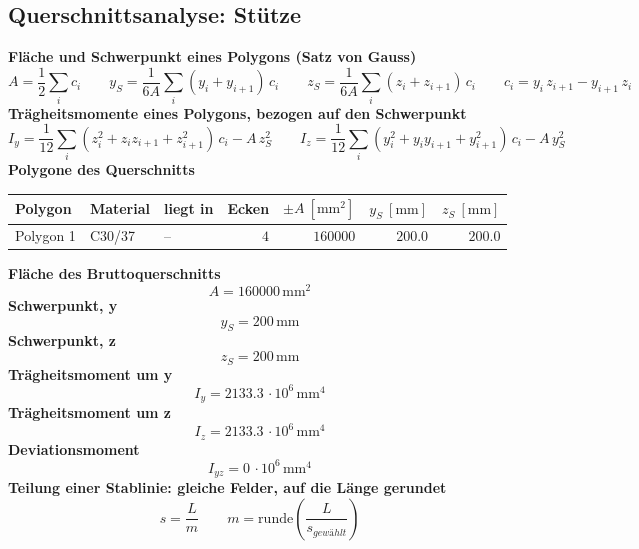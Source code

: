 \documentclass[11pt,a4paper]{article}
\begin{document}
\subsection{Querschnittsanalyse: Stütze}
\noindent\textbf{Fläche und Schwerpunkt eines Polygons (Satz von Gauss)}
\begin{equation*}
A = \frac{1}{2} \sum_i c_i \qquad y_S = \frac{1}{6A} \sum_i (y_i + y_{i+1})\, c_i \qquad z_S = \frac{1}{6A} \sum_i (z_i + z_{i+1})\, c_i \qquad c_i = y_i\, z_{i+1} - y_{i+1}\, z_i
\end{equation*}
\noindent\textbf{Trägheitsmomente eines Polygons, bezogen auf den Schwerpunkt}
\begin{equation*}
I_y = \frac{1}{12} \sum_i (z_i^2 + z_i z_{i+1} + z_{i+1}^2)\, c_i - A\, z_S^2\qquad I_z = \frac{1}{12} \sum_i (y_i^2 + y_i y_{i+1} + y_{i+1}^2)\, c_i - A\, y_S^2
\end{equation*}
\noindent\textbf{Polygone des Querschnitts}
\begin{longtable}{lllrrrr}
\hline
Polygon & Material & liegt in & Ecken & $\pm A\ [\mathrm{mm}^2]$ & $y_S\ [\mathrm{mm}]$ & $z_S\ [\mathrm{mm}]$ \\
\hline
\endhead
Polygon 1 & C30/37 & – & $4$ & $160000$ & $200.0$ & $200.0$ \\
\hline
\end{longtable}
\noindent\textbf{Fläche des Bruttoquerschnitts}
\begin{equation*}
A = 160000\,\mathrm{mm}^{2}
\end{equation*}
\noindent\textbf{Schwerpunkt, y}
\begin{equation*}
y_S = 200\,\mathrm{mm}
\end{equation*}
\noindent\textbf{Schwerpunkt, z}
\begin{equation*}
z_S = 200\,\mathrm{mm}
\end{equation*}
\noindent\textbf{Trägheitsmoment um y}
\begin{equation*}
I_y = 2133.3\,\cdot 10^{6}\,\mathrm{mm}^{4}
\end{equation*}
\noindent\textbf{Trägheitsmoment um z}
\begin{equation*}
I_z = 2133.3\,\cdot 10^{6}\,\mathrm{mm}^{4}
\end{equation*}
\noindent\textbf{Deviationsmoment}
\begin{equation*}
I_{yz} = 0\,\cdot 10^{6}\,\mathrm{mm}^{4}
\end{equation*}
\noindent\textbf{Teilung einer Stablinie: gleiche Felder, auf die Länge gerundet}
\begin{equation*}
s = \frac{L}{m} \qquad m = \mathrm{runde}\left(\frac{L}{s_{gewählt}}\right)
\end{equation*}
\end{document}
